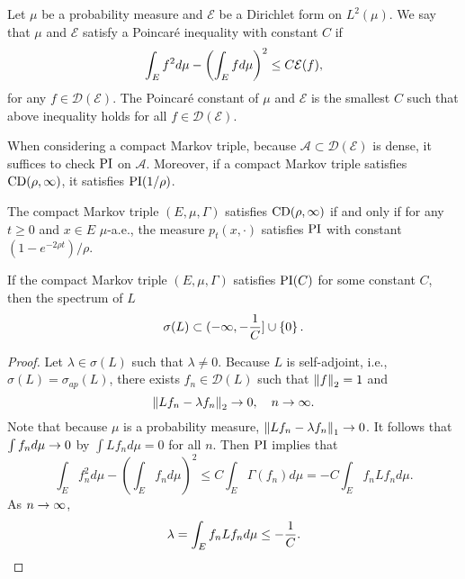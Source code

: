 \begin{defn}
    Let $\mu$ be a probability measure and $\mathcal{E}$ be a Dirichlet form on $L^2(\mu)$. We say that $\mu$ and $\mathcal{E}$ satisfy a Poincar\'e inequality with constant $C$ if
    \begin{equation*}
    	\int_E f^2 d\mu - \left(\int_E fd\mu\right)^2 \leq C\mathcal{E}(f),
    \end{equation*}
    for any $f \in \mathcal{D}(\mathcal{E})$. The Poincar\'e constant of $\mu$ and $\mathcal{E}$ is the smallest $C$ such that above inequality holds for all $f \in \mathcal{D}(\mathcal{E})$.
\end{defn}
\begin{rmk}
    When considering a compact Markov triple, because $\mathcal{A} \subset \mathcal{D}(\mathcal{E})$ is dense, it suffices to check $\operatorname{PI}$ on $\mathcal{A}$. Moreover, if a compact Markov triple satisfies $\operatorname{CD}(\rho,\infty)$, it satisfies $\operatorname{PI}(1/\rho)$.
\end{rmk}
\begin{cor}
    The compact Markov triple $(E,\mu,\Gamma)$ satisfies $\operatorname{CD}(\rho,\infty)$ if and only if for any $t \geq 0$ and $x \in E$ $\mu$-a.e., the measure $p_t(x,\cdot)$ satisfies $\operatorname{PI}$ with constant $(1 - e^{-2\rho t})/\rho$.
\end{cor}

\begin{prop}
    If the compact Markov triple $(E,\mu,\Gamma)$ satisfies $\operatorname{PI}(C)$ for some constant $C$, then the spectrum of $L$
    \begin{equation*}
    	\sigma(L) \subset (-\infty,-\frac{1}{C}] \cup \left\{0\right\}.
    \end{equation*}
\end{prop}
\begin{proof}
    Let $\lambda \in \sigma(L)$ such that $\lambda \neq 0$. Because $L$ is self-adjoint, i.e., $\sigma(L) = \sigma_{ap}(L)$, there exists $f_n \in \mathcal{D}(L)$ such that $\left\lVert f\right\lVert_2 = 1$ and
    \begin{equation*}
    	\left\lVert Lf_n - \lambda f_n\right\lVert_2 \rightarrow 0,\quad n \rightarrow \infty.
    \end{equation*}
    Note that because $\mu$ is a probability measure, $\left\lVert Lf_n - \lambda f_n\right\lVert_1 \rightarrow 0$. It follows that $\int f_n d\mu \rightarrow 0$ by $\int Lf_n d\mu = 0$ for all $n$. Then $\operatorname{PI}$ implies that
    \begin{equation*}
    	\int_E f_n^2 d \mu-\left(\int_E f_n d \mu\right)^2 \leq C \int_E \Gamma\left(f_n\right) d \mu=-C \int_E f_n L f_n d \mu.
    \end{equation*}
    As $n\rightarrow \infty$,
    \begin{equation*}
    	\lambda = \int_E f_n L f_n d \mu \leq -\frac{1}{C}. \qedhere
    \end{equation*}
\end{proof}


